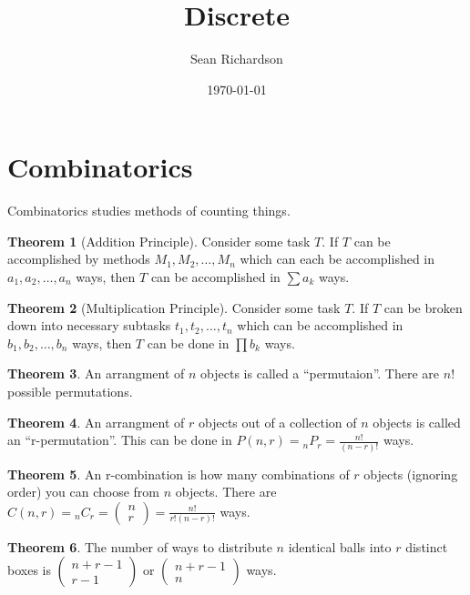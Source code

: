 \documentclass[11pt]{article}
\theoremstyle{definition}
\newtheorem{theorem}{Theorem}[section]
\begin{document}
\title{Discrete}
\author{Sean Richardson}
\date{\today}
\maketitle
\tableofcontents

\section{Combinatorics}

Combinatorics studies methods of counting things.

\begin{theorem}[Addition Principle]
    Consider some task $T$. If $T$ can be accomplished by methods $M_1,M_2,\dots,M_n$ which can each be accomplished in $a_1, a_2, \dots, a_n$ ways, then $T$ can be accomplished in $\sum a_k$ ways.
\end{theorem}
\begin{theorem}[Multiplication Principle]
    Consider some task $T$. If $T$ can be broken down into necessary subtasks $t_1,t_2,\dots,t_n$ which can be accomplished in $b_1,b_2,\dots,b_n$ ways, then $T$ can be done in $\prod b_k$ ways.
\end{theorem}
\begin{theorem}
    An arrangment of $n$ objects is called a ``permutaion''. There are $n!$ possible permutations.
\end{theorem}
\begin{theorem}
    An arrangment of $r$ objects out of a collection of $n$ objects is called an ``r-permutation''. This can be done in $P(n,r)= {}_{n}P_r = \frac{n!}{(n-r)!}$ ways.
\end{theorem}
\begin{theorem}
    An r-combination is how many combinations of $r$ objects (ignoring order) you can choose from $n$ objects. There are $C(n,r)={}_{n}C_r=(\begin{smallmatrix}n \\ r \end{smallmatrix}) = \frac{n!}{r!(n-r)!}$ ways.
\end{theorem}
\begin{theorem}
    The number of ways to distribute $n$ identical balls into $r$ distinct boxes is $(\begin{smallmatrix} n+r-1 \\ r-1 \end{smallmatrix})$ or $(\begin{smallmatrix} n+r-1 \\ n \end{smallmatrix})$ ways.
\end{theorem}
\end{document}
